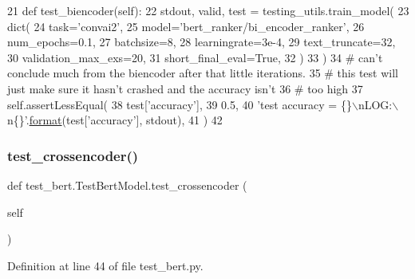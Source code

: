 \begin{DoxyCode}
21     \textcolor{keyword}{def }test\_biencoder(self):
22         stdout, valid, test = testing\_utils.train\_model(
23             dict(
24                 task=\textcolor{stringliteral}{'convai2'},
25                 model=\textcolor{stringliteral}{'bert\_ranker/bi\_encoder\_ranker'},
26                 num\_epochs=0.1,
27                 batchsize=8,
28                 learningrate=3e-4,
29                 text\_truncate=32,
30                 validation\_max\_exs=20,
31                 short\_final\_eval=\textcolor{keyword}{True},
32             )
33         )
34         \textcolor{comment}{# can't conclude much from the biencoder after that little iterations.}
35         \textcolor{comment}{# this test will just make sure it hasn't crashed and the accuracy isn't}
36         \textcolor{comment}{# too high}
37         self.assertLessEqual(
38             test[\textcolor{stringliteral}{'accuracy'}],
39             0.5,
40             \textcolor{stringliteral}{'test accuracy = \{\}\(\backslash\)nLOG:\(\backslash\)n\{\}'}.\hyperlink{namespaceparlai_1_1chat__service_1_1services_1_1messenger_1_1shared__utils_a32e2e2022b824fbaf80c747160b52a76}{format}(test[\textcolor{stringliteral}{'accuracy'}], stdout),
41         )
42 
\end{DoxyCode}
\mbox{\label{classtest__bert_1_1TestBertModel_a1576f491a7c638f37d3e5e3317478931}} 
\subsubsection{\texorpdfstring{test\+\_\+crossencoder()}{test\_crossencoder()}}
{\footnotesize\ttfamily def test\+\_\+bert.\+Test\+Bert\+Model.\+test\+\_\+crossencoder (\begin{DoxyParamCaption}\item[{}]{self }\end{DoxyParamCaption})}



Definition at line 44 of file test\+\_\+bert.\+py.


